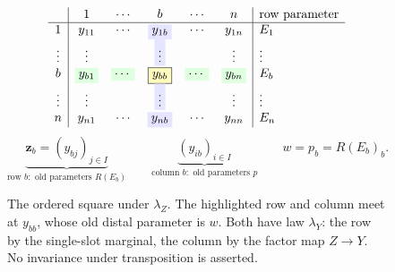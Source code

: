 \begin{figure}[tbp]
\centering
\begingroup
\setlength{\arraycolsep}{10pt}
\renewcommand{\arraystretch}{1.45}
\[
\begin{array}{c|ccccc|l}
 &1&\cdots&b&\cdots&n&\text{row parameter}\\ \hline
 1&y_{11}&\cdots&\colorbox{blue!10}{$y_{1b}$}&\cdots&y_{1n}&E_1\\
 \vdots&\vdots&&\colorbox{blue!10}{$\vdots$}&&\vdots&\vdots\\
 b&\colorbox{green!12}{$y_{b1}$}&
   \colorbox{green!12}{$\cdots$}&
   \fcolorbox{black}{yellow!25}{$y_{bb}$}&
   \colorbox{green!12}{$\cdots$}&
   \colorbox{green!12}{$y_{bn}$}&E_b\\
 \vdots&\vdots&&\colorbox{blue!10}{$\vdots$}&&\vdots&\vdots\\
 n&y_{n1}&\cdots&\colorbox{blue!10}{$y_{nb}$}&\cdots&y_{nn}&E_n
\end{array}
\]
\[
 \underbrace{\mathbf z_b=(y_{bj})_{j\in I}}_{\text{row }b:
       \text{ old parameters }R(E_b)}
 \qquad
 \underbrace{(y_{ib})_{i\in I}}_{\text{column }b:
       \text{ old parameters }p}
 \qquad
 w=p_b=R(E_b)_b.
\]
\endgroup
\caption{The ordered square under $\lambda_Z$. The highlighted row
and column meet at $y_{bb}$, whose old distal parameter is $w$.
Both have law $\lambda_Y$: the row by the single-slot marginal,
the column by the factor map $Z\to Y$. No invariance under
transposition is asserted.}
\label{fig:square}
\end{figure}
